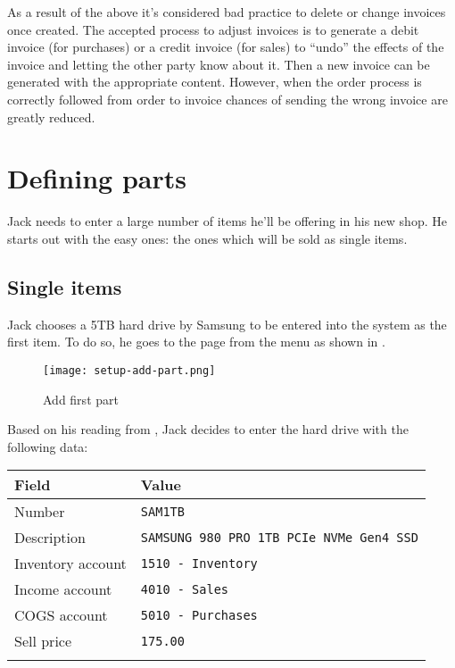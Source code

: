 As a result of the above it's considered bad practice to delete or change invoices once
created. The accepted process to adjust invoices is to generate a debit invoice (for purchases)
or a credit invoice (for sales) to ``undo'' the effects of the invoice and letting the other party
know about it. Then a new invoice can be generated with the appropriate content. However,
when the order process is correctly followed from order to invoice chances of sending the wrong
invoice are greatly reduced.

\section{Defining parts}
\label{sec-stock-parts}

Jack needs to enter a large number of items he'll be offering in his new shop. He starts out
with the easy ones: the ones which will be sold as single items.

\subsection{Single items}
\label{subsec-stock-parts-single-item}

Jack chooses a 5TB hard drive by Samsung to be entered into the system as the first item.
To do so, he goes to the  page from the menu
as shown in .

\begin{figure}[h]
	\texttt{[image: setup-add-part.png]}
	\caption{Add first part}
	\label{fig:setup-add-part}
\end{figure}

Based on his reading from , Jack decides to enter the hard
drive with the following data:

\begin{tabular}{ll}
Field & Value\\ \hline
Number & \texttt{SAM1TB}\\
Description & \texttt{SAMSUNG 980 PRO 1TB PCIe NVMe Gen4 SSD} \\
Inventory account &  \texttt{1510 - Inventory}\\
Income account &  \texttt{4010 - Sales}\\
COGS account &  \texttt{5010 - Purchases}\\
Sell price &  \texttt{175.00}\\
\\
\end{tabular}

